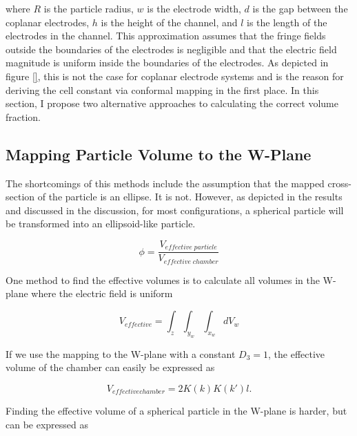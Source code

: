 \noindent where $R$ is the particle radius, $w$ is the electrode width, $d$ is the gap between the coplanar electrodes, $h$ is the height of the channel, and $l$ is the length of the electrodes in the channel. This approximation assumes that the fringe fields outside the boundaries of the electrodes is negligible and that the electric field magnitude is uniform inside the boundaries of the electrodes. As depicted in figure \ref{}, this is not the case for coplanar electrode systems and is the reason for deriving the cell constant via conformal mapping in the first place. In this section, I propose two alternative approaches to calculating the correct volume fraction. 

\subsection*{Mapping Particle Volume to the W-Plane}
\par The shortcomings of this methods include the assumption that the mapped cross-section of the particle is an ellipse. It is not. However, as depicted in the results and discussed in the discussion, for most configurations, a spherical particle will be transformed into an ellipsoid-like particle. 

\begin{equation}
    \phi = \frac{V_{effective\;particle}}{V_{effective\;chamber}}
\end{equation}

\par One method to find the effective volumes is to calculate all volumes in the W-plane where the electric field is uniform

\begin{equation}
    V_{effective} = \int_{z}\int_{y_w}\int_{x_w} dV_w
\end{equation}

\noindent If we use the mapping to the W-plane with a constant $D_3 = 1$, the effective volume of the chamber can easily be expressed as

\begin{equation}
    V_{effective chamber} = 2K(k)K(k')l.
\end{equation}

\noindent Finding the effective volume of a spherical particle in the W-plane is harder, but can be expressed as
\begin{equation}
    
\end{equation}


